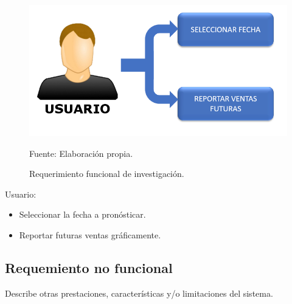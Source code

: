 \begin{figure}[h!]
	\centering
		\includegraphics[scale=0.7]{imagenes/requerimientos.png}
		\caption{Requerimiento funcional de investigación.}
	\begin{center}
    Fuente: Elaboración propia.
    \end{center}
	\label{fig:reqFuncional}
\end{figure}
\newpage
Usuario: 
\begin{itemize}
    \item Seleccionar la fecha a pronósticar.
    \item Reportar futuras ventas gráficamente.
\end{itemize}

\subsection{Requemiento no funcional}
Describe otras prestaciones, características y/o limitaciones del sistema.

